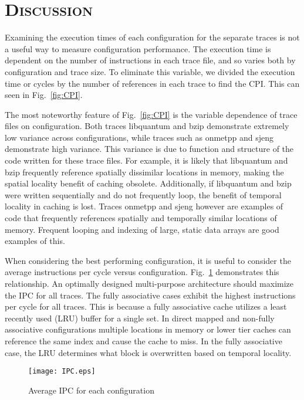 \documentclass[FinalReport.tex]{subfiles}
\begin{document}
\bigskip

\section*{\textsc{\Large Discussion}}
 Examining the execution times of each configuration for the separate traces is not a useful way to measure configuration performance.  The execution time is dependent on the number of instructions in each trace file, and so varies both by configuration and trace size.  To eliminate this variable, we divided the execution time or cycles by the number of references in each trace to find the CPI.  This can seen in Fig.~\ref{fig:CPI}.
 
	The most noteworthy feature of Fig.~\ref{fig:CPI} is the variable dependence of trace files on configuration.  Both traces libquantum and bzip demonstrate extremely low variance across configurations, while traces such as onmetpp and sjeng demonstrate high variance. This variance is due to function and structure of the code written for these trace files. For example, it is likely that libquantum and bzip frequently reference spatially dissimilar locations in memory, making the spatial locality benefit of caching obsolete. Additionally, if libquantum and bzip were written sequentially and do not frequently loop, the benefit of temporal locality in caching is lost. Traces onmetpp and sjeng however are examples of code that frequently references spatially and temporally similar locations of memory. Frequent looping and indexing of large, static data arrays are good examples of this.
	
	 When considering the best performing configuration, it is useful to consider the average instructions per cycle versus configuration. Fig.~\ref{fig:IPC} demonstrates this relationship. An optimally designed multi-purpose architecture should maximize the IPC for all traces. The fully associative cases exhibit the highest instructions per cycle for all traces. This is because a fully associative cache utilizes a least recently used (LRU) buffer for a single set. In direct mapped and non-fully associative configurations multiple locations in memory or lower tier caches can reference the same index and cause the cache to miss.  In the fully associative case, the LRU determines what block is overwritten based on temporal locality.  

\begin{figure}[H]
\centering
\texttt{[image: IPC.eps]}
\caption{Average IPC for each configuration\label{fig:IPC}}
\end{figure}
\end{document}
